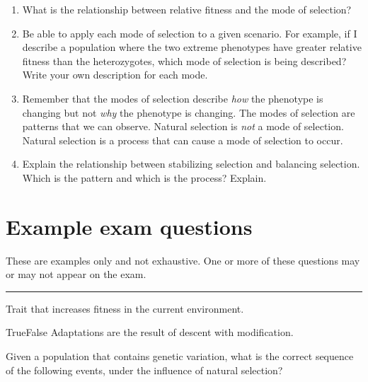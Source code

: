 \documentclass[letterpaper]{tufte-handout}
\begin{document}
\begin{enumerate}
	\item What is the relationship between relative fitness and the mode of selection?

	\item Be able to apply each mode of selection to a given scenario.  For example, if I describe a population where the two extreme phenotypes have greater relative fitness than the heterozygotes, which mode of selection is being described?  Write your own description for each mode.
	
	\item Remember that the modes of selection describe \emph{how} the phenotype is changing but not \emph{why} the phenotype is changing. The modes of selection are patterns that we can observe. Natural selection is \emph{not} a mode of selection. Natural selection is a process that can cause a mode of selection to occur. 
	
	\item Explain the relationship between stabilizing selection and balancing selection. Which is the pattern and which is the process? Explain.

\end{enumerate}

\section*{Example exam questions}

These are examples only and not exhaustive. One or more of these questions may or may not appear on the exam.

\bigskip

\noindent \rule{1in}{0.4pt} Trait that increases fitness in the current environment.

\bigskip

\noindent True\hspace{1em}False\hspace{1em} Adaptations are the result of descent with modification. 

\bigskip

\noindent Given a population that contains genetic variation, what is the correct sequence of the following events, under the influence of natural selection?
\end{document}
